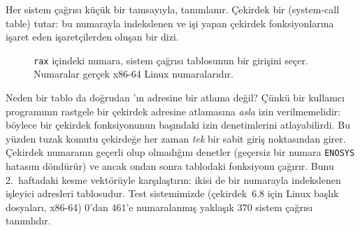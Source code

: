 Her sistem çağrısı küçük bir tamsayıyla,  tanımlanır. Çekirdek bir  (system-call table) tutar: bu numarayla indekslenen ve işi yapan çekirdek fonksiyonlarına işaret eden işaretçilerden oluşan bir dizi.

\begin{figure}[H]
\centering
{}
\caption{\texttt{rax} içindeki numara, sistem çağrısı tablosunun bir girişini seçer. Numaralar gerçek x86-64 Linux numaralarıdır.}
\end{figure}

Neden bir tablo da doğrudan 'ın adresine bir atlama değil? Çünkü bir kullanıcı programının rastgele bir çekirdek adresine atlamasına \emph{asla} izin verilmemelidir: böylece bir çekirdek fonksiyonunun başındaki izin denetimlerini atlayabilirdi. Bu yüzden tuzak komutu çekirdeğe her zaman \emph{tek} bir sabit giriş noktasından girer. Çekirdek numaranın geçerli olup olmadığını denetler (geçersiz bir numara \texttt{ENOSYS} hatasını döndürür) ve ancak ondan sonra tablodaki fonksiyonu çağırır. Bunu 2.~haftadaki kesme vektörüyle karşılaştırın: ikisi de bir numarayla indekslenen işleyici adresleri tablosudur. Test sistemimizde (çekirdek~6.8 için Linux başlık dosyaları, x86-64) $0$'dan $461$'e numaralanmış yaklaşık $370$ sistem çağrısı tanımlıdır.

